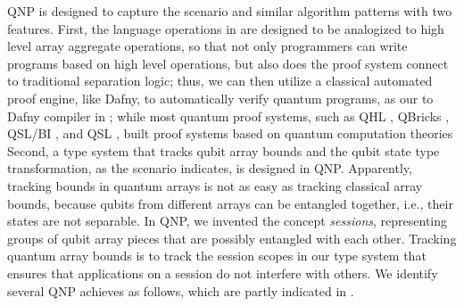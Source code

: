 QNP is designed to capture the scenario and similar algorithm patterns with two features. First, the language operations in \qafny are designed to be analogized to high level array aggregate operations, so that not only programmers can write programs based on high level operations, but also does the \qafny proof system connect to traditional separation logic; thus, we can then utilize a classical automated proof engine, like Dafny, to automatically verify quantum programs, as our \qafny to Dafny compiler in ;
while most quantum proof systems, such as QHL \cite{qhoreusage}, QBricks \cite{qbricks},  QSL/BI \cite{qsepa}, and QSL \cite{quantumseparation}, built proof systems based on quantum computation theories
Second, a type system that tracks qubit array bounds and the qubit state type transformation, as the scenario indicates, is designed in QNP. Apparently, tracking bounds in quantum arrays is not as easy as tracking classical array bounds, because qubits from different arrays can be entangled together, i.e., their states are not separable. In QNP, we invented the concept \emph{sessions}, representing groups of qubit array pieces that are possibly entangled with each other. Tracking quantum array bounds is to track the session scopes in our type system that ensures that applications on a session do not interfere with others. 
We identify several QNP achieves as follows, which are partly indicated in .
